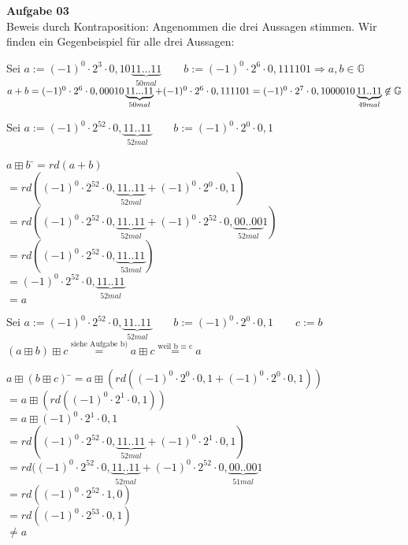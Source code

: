 \documentclass[a4paper,10pt]{article}
\begin{document}
	\parindent0pt
	\textbf{Aufgabe 03}\\
	
	Beweis durch Kontraposition: Angenommen die drei Aussagen stimmen. Wir finden ein Gegenbeispiel für alle drei Aussagen:\\
	
	\begin{compactenum} [a)]
		\item Sei $ a := (-1)^0\cdot2^{3}\cdot0,10\underbrace{11...11}_{50 mal} \qquad b := (-1)^0\cdot2^{6}\cdot0,111101 \Longrightarrow a, b \in \mathbb{G}$\\
		$ a+b = (-1)^0\cdot2^{6}\cdot0,00010\underbrace{11...11}_{50 mal} + (-1)^0\cdot2^{6}\cdot0,111101 \\
		= (-1)^0\cdot2^{7}\cdot0,1000010\underbrace{11..11}_{49 mal} \not\in \mathbb{G}$
		\item  Sei $ a:= (-1)^0\cdot2^{52}\cdot0,\underbrace{11..11}_{52 mal} \qquad b:= (-1)^0\cdot2^0\cdot0,1$\\
		\begin{tabbing}
			$ a\boxplus b$ \=$= rd(a+b)$ \\
			\>$ =rd((-1)^0\cdot2^{52}\cdot0,\underbrace{11..11}_{52 mal}+(-1)^0\cdot2^0\cdot0,1) $ \\
			\>$ =rd((-1)^0\cdot2^{52}\cdot0,\underbrace{11..11}_{52 mal}+(-1)^0\cdot2^{52}\cdot0,\underbrace{00..00}_{52 mal}1) $ \\
			\>$ =rd((-1)^0\cdot2^{52}\cdot0,\underbrace{11..11}_{53 mal})$\\
			\>$ =(-1)^0\cdot2^{52}\cdot0,\underbrace{11..11}_{52 mal}$\\
			\>$ =a $
		\end{tabbing}
		\item Sei $ a:= (-1)^0\cdot2^{52}\cdot0,\underbrace{11..11}_{52 mal} \qquad b:= (-1)^0\cdot2^0\cdot0,1 \qquad c:= b $\\
		$ (a\boxplus b) \boxplus c \overset{\text{siehe Aufgabe b)}}{=} a \boxplus c \overset{\text{weil b $\equiv$ c}}{=} a$\\
		\begin{tabbing}
			$ a\boxplus (b\boxplus c) $ \=$ = a \boxplus (rd((-1)^0\cdot2^0\cdot0,1+(-1)^0\cdot2^0\cdot0,1))$\\
			\> $ =a \boxplus (rd((-1)^0\cdot2^{1}\cdot0,1)) $\\
			\> $ =a \boxplus (-1)^0\cdot2^{1}\cdot0,1 $\\
			\> $ =rd((-1)^0\cdot2^{52}\cdot0,\underbrace{11..11}_{52 mal}+(-1)^0\cdot2^{1}\cdot0,1) $\\
			\> $ =rd((-1)^0\cdot2^{52}\cdot0,\underbrace{11..11}_{52 mal}+(-1)^0\cdot2^{52}\cdot0,\underbrace{00..00}_{51 mal}1 $\\
			\> $ =rd((-1)^0\cdot2^{52}\cdot1,0) $ \\
			\> $ =rd((-1)^0\cdot2^{53}\cdot0,1) $\\
			\> $ \neq a $
		\end{tabbing}
	\end{compactenum}
\end{document}
